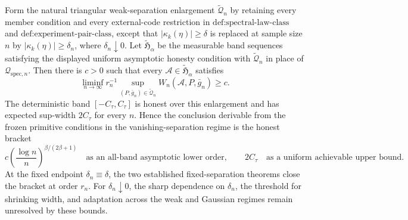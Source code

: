 Form the natural triangular weak-separation enlargement \(\widetilde{\mathcal Q}_n\) by retaining every member condition and every external-code restriction in \(\text{def:spectral-law-class}\) and \(\text{def:experiment-pair-class}\), except that \(|\kappa_k(\eta)|\ge\delta\) is replaced at sample size \(n\) by \(|\kappa_k(\eta)|\ge\delta_n\), where \(\delta_n\downarrow0\).  Let \(\widetilde{\mathfrak H}_\alpha\) be the measurable band sequences satisfying the displayed uniform asymptotic honesty condition with \(\widetilde{\mathcal Q}_n\) in place of \(\mathcal Q_{\mathrm{spec},n}\).  Then there is \(c>0\) such that every \(\mathcal A\in\widetilde{\mathfrak H}_\alpha\) satisfies
\[
 \liminf_{n\to\infty}r_n^{-1}
 \sup_{(P,\bar g_n)\in\widetilde{\mathcal Q}_n}
 W_n(\mathcal A,P,\bar g_n)\ge c.
\]
The deterministic band \([-C_\tau,C_\tau]\) is honest over this enlargement and has expected sup-width \(2C_\tau\) for every \(n\).  Hence the conclusion derivable from the frozen primitive conditions in the vanishing-separation regime is the honest bracket
\[
 c\left(\frac{\log n}{n}\right)^{\beta/(2\beta+1)}
 \quad\text{as an all-band asymptotic lower order},
 \qquad
 2C_\tau\quad\text{as a uniform achievable upper bound}.
\]
At the fixed endpoint \(\delta_n\equiv\delta\), the two established fixed-separation theorems close the bracket at order \(r_n\).  For \(\delta_n\downarrow0\), the sharp dependence on \(\delta_n\), the threshold for shrinking width, and adaptation across the weak and Gaussian regimes remain unresolved by these bounds.